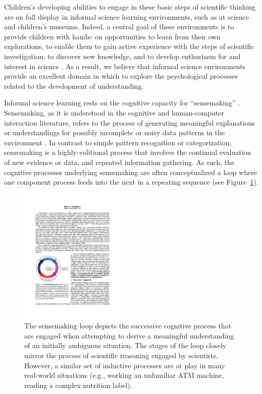 \documentclass[10pt,letterpaper]{article}
\begin{document}
Children's developing abilities to engage in these basic steps of scientific thinking are on full display in informal science learning environments, such as at science and children's museums. Indeed, a central goal of these environments is to provide children with hands- on opportunities to learn from their own explorations, to enable them to gain active experience with the steps of scientific investigation, to discover new knowledge, and to develop enthusiasm for and interest in science \cite{Bell:2009,Fenichel:2010}. As a result, we believe that informal science environments provide an excellent domain in which to explore the psychological processes related to the development of understanding.

Informal science learning rests on the cognitive capacity for ``sensemaking'' \cite{Renner:2011}. Sensemaking, as it is understood in the cognitive and human-computer interaction literature, refers to the process of generating meaningful explanations or understandings for possibly incomplete or noisy data patterns in the environment \cite{Russell:1993,Klein:2006a,Klein:2006b}. In contrast to simple pattern recognition or categorization, sensemaking is a highly-volitional process that involves the continual evaluation of new evidence or data, and repeated information gathering. As such, the cognitive processes underlying sensemaking are often conceptualized a loop where one component process feeds into the next in a repeating sequence (see Figure~\ref{fig:sensemaking_loop}).

\begin{figure}[!h]
  \centering
  \includegraphics[width=0.45\textwidth]{figures/sensemaking_loop}
  \caption{The sensemaking loop depicts the successive cognitive process that are engaged when attempting to derive a meaningful understanding of an initially ambiguous situation. The stages of the loop closely mirror the process of scientific reasoning engaged by scientists. However, a similar set of inductive processes are at play in many real-world situations (e.g., working an unfamiliar ATM machine, reading a complex nutrition label).}
  \label{fig:sensemaking_loop}
\end{figure} 
\end{document}
